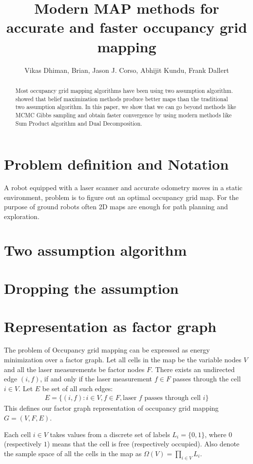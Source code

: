 \documentclass[letterpaper, 10 pt, conference]{ieeeconf} %
\title{Modern MAP methods for accurate and faster occupancy grid mapping}
\author{Vikas Dhiman, Brian, Jason J. Corso, Abhijit Kundu, Frank Dallert}
\begin{document}
\maketitle
\begin{abstract}
  Most occupancy grid mapping algorithms have been using two assumption
  algorithm.  \cite{merali2013icra} showed that belief maximization methods
  produce better maps than the traditional two assumption algorithm.  In this
  paper, we show that we can go beyond methods like MCMC Gibbs sampling and
  obtain faster convergence by using modern methods like Sum Product algorithm
  and Dual Decomposition.
\end{abstract}
\section{Problem definition and Notation}
A robot equipped with a laser scanner and accurate odometry moves in a static
environment, problem is to figure out an optimal occupancy grid map. For the
purpose of ground robots often 2D maps are enough for path planning and
exploration. 
\section{Two assumption algorithm}
\section{Dropping the assumption}
\section{Representation as factor graph}
The problem of Occupancy grid mapping can be expressed as energy minimization
over a factor graph. Let all cells in the map be the variable nodes $V$ and all
the laser measurements be factor nodes $F$. 
There
exists an undirected edge $(i, f)$, if and only if the laser
measurement $f \in F$ passes through the cell $i \in V$. Let $E$ be set of all such edges:
\begin{align}
  E = \{(i, f) : i \in V, f \in F, \text{laser $f$ passes through cell $i$}\}
\end{align}
This defines our factor graph representation of occupancy grid mapping $G = (V, F, E)$.

%
%
Each cell $i \in V$ takes values
from a discrete set of labels $L_i = \{0, 1\}$, where $0$ (respectively $1$) means that
the cell is free (respectively occupied). Also denote the sample space of all the
cells in the map as $\Omega(V) = \prod_{i \in V} L_i$.
\end{document}
